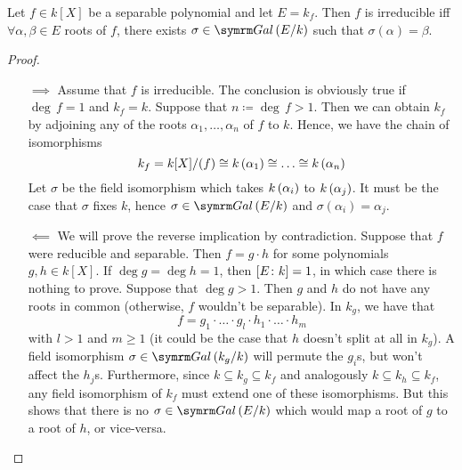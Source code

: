 \begin{exercise}
Let \(f \in k[X]\) be a separable polynomial and let \(E = k_f\). Then \(f\) is irreducible iff \(\forall \alpha, \beta \in E\) roots of \(f\), there exists \(\sigma \in \Gal{E}{k}\) such that \(\sigma(\alpha) = \beta\).
\end{exercise}
\begin{proof}
~
\begin{itemize}
    \item[\(\implies\)] Assume that \(f\) is irreducible. The conclusion is obviously true if \(\deg \, f = 1\) and \(k_f = k\). Suppose that \(n \coloneq \deg \, f > 1\). Then we can obtain \(k_f\) by adjoining any of the roots \(\alpha_1, \dots, \alpha_n\) of \(f\) to \(k\). Hence, we have the chain of isomorphisms
    \[
        k_f = k[X]/(f) \cong \adjoin[k]{\alpha_1} \cong \dots \cong \adjoin[k]{\alpha_n}
    \]
    Let \(\sigma\) be the field isomorphism which takes \(\adjoin[k]{\alpha_i}\) to \(\adjoin[k]{\alpha_j}\). It must be the case that \(\sigma\) fixes \(k\), hence \(\sigma \in \Gal{E}{k}\) and \(\sigma\left(\alpha_i\right) = \alpha_j\).

    \item[\(\impliedby\)] We will prove the reverse implication by contradiction. Suppose that \(f\) were reducible and separable. Then \(f = g \cdot h\) for some polynomials \(g, h \in k[X]\). If \(\deg g = \deg h = 1\), then \(\degree{E}{k} = 1\), in which case there is nothing to prove. Suppose that \(\deg g > 1\). Then \(g\) and \(h\) do not have any roots in common (otherwise, \(f\) wouldn't be separable). In \(k_g\), we have that
    \[
        f = g_1 \cdot \hdots \cdot g_l \cdot h_1 \cdot \hdots \cdot h_m
    \]
    with \(l > 1\) and \(m \geq 1\) (it could be the case that \(h\) doesn't split at all in \(k_g\)). A field isomorphism \(\sigma \in \Gal{k_g}{k}\) will permute the \(g_i\)s, but won't affect the \(h_j\)s. Furthermore, since \(k \subseteq k_g \subseteq k_f\) and analogously \(k \subseteq k_h \subseteq k_f\), any field isomorphism of \(k_f\) must extend one of these isomorphisms. But this shows that there is no \(\sigma \in \Gal{E}{k}\) which would map a root of \(g\) to a root of \(h\), or vice-versa.
\end{itemize}
\end{proof}
